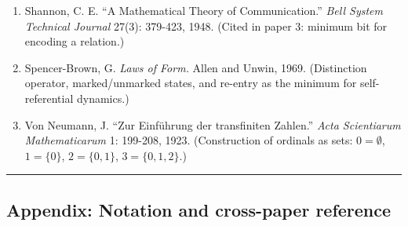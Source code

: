 \documentclass[
  11pt,
  letterpaper,
]{article}
\begin{document}
\begin{enumerate}
  Peirce, C. S. \emph{Collected Papers of Charles Sanders Peirce.} Vol.
  1. Harvard University Press, 1931. (§§300-353: Categories of
  Firstness, Secondness, Thirdness; §346: formal irreducibility of
  Thirdness.)
\item
  Shannon, C. E. ``A Mathematical Theory of Communication.'' \emph{Bell
  System Technical Journal} 27(3): 379-423, 1948. (Cited in paper 3:
  minimum bit for encoding a relation.)
\item
  Spencer-Brown, G. \emph{Laws of Form.} Allen and Unwin, 1969.
  (Distinction operator, marked/unmarked states, and re-entry as the
  minimum for self-referential dynamics.)
\item
  Von Neumann, J. ``Zur Einführung der transfiniten Zahlen.'' \emph{Acta
  Scientiarum Mathematicarum} 1: 199-208, 1923. (Construction of
  ordinals as sets: \(0 = \emptyset\), \(1 = \{0\}\), \(2 = \{0,1\}\),
  \(3 = \{0,1,2\}\).)
\end{enumerate}

\begin{center}\rule{0.5\linewidth}{0.5pt}\end{center}

\subsection{Appendix: Notation and cross-paper
reference}\label{appendix-notation-and-cross-paper-reference}
\end{document}

